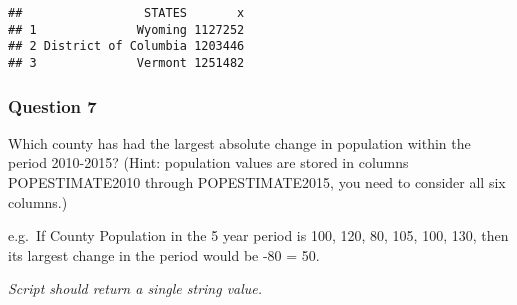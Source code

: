 \documentclass[
]{article}
\newenvironment{Shaded}{\begin{snugshade}}{\end{snugshade}}
\newcommand{\CommentTok}[1]{\textcolor[rgb]{0.56,0.35,0.01}{\textit{#1}}}
\newcommand{\DataTypeTok}[1]{\textcolor[rgb]{0.13,0.29,0.53}{#1}}
\newcommand{\DecValTok}[1]{\textcolor[rgb]{0.00,0.00,0.81}{#1}}
\newcommand{\KeywordTok}[1]{\textcolor[rgb]{0.13,0.29,0.53}{\textbf{#1}}}
\newcommand{\NormalTok}[1]{#1}
\newcommand{\OperatorTok}[1]{\textcolor[rgb]{0.81,0.36,0.00}{\textbf{#1}}}
\newcommand{\StringTok}[1]{\textcolor[rgb]{0.31,0.60,0.02}{#1}}
\begin{document}
\begin{verbatim}
##                 STATES       x
## 1              Wyoming 1127252
## 2 District of Columbia 1203446
## 3              Vermont 1251482
\end{verbatim}

\hypertarget{question-7}{%
\subsubsection{Question 7}\label{question-7}}

Which county has had the largest absolute change in population within
the period 2010-2015? (Hint: population values are stored in columns
POPESTIMATE2010 through POPESTIMATE2015, you need to consider all six
columns.)

e.g.~If County Population in the 5 year period is 100, 120, 80, 105,
100, 130, then its largest change in the period would be
-80\textbar{} = 50.

\emph{Script should return a single string value.}

\begin{Shaded}
\end{Shaded}
\end{document}
